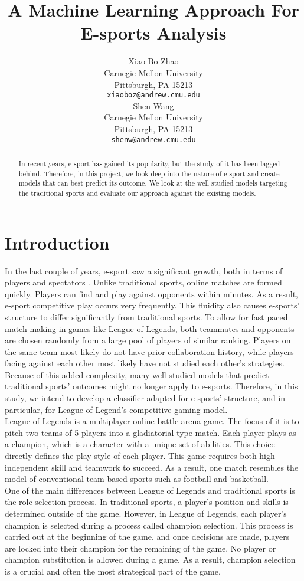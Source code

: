 \documentclass{article} %
\title{A Machine Learning Approach For E-sports Analysis}
\author{
Xiao Bo Zhao\\
Carnegie Mellon University\\
Pittsburgh, PA 15213 \\
\texttt{xiaoboz@andrew.cmu.edu} \\
\And
Shen Wang\\
Carnegie Mellon University\\
Pittsburgh, PA 15213 \\
\texttt{shenw@andrew.cmu.edu} \\
}
\begin{document}
\maketitle

\begin{abstract}
In recent years, e-sport has gained its popularity, but the study of it has been lagged behind. Therefore, in this project, we look deep into the nature of e-sport and create models that can best predict its outcome. We look at the well studied models targeting the traditional sports and evaluate our approach against the existing models.
\end{abstract}

\section{Introduction}
In the last couple of years, e-sport saw a significant growth, both in terms of players and spectators \cite{Witkowski:2013:ERC:2513002.2513008}. Unlike traditional sports, online matches are formed quickly. Players can find and play against opponents within minutes. As a result, e-sport competitive play occurs very frequently. This fluidity also causes e-sports’ structure to differ significantly from traditional sports. To allow for fast paced match making in games like League of Legends, both teammates and opponents are chosen randomly from a large pool of players of similar ranking. Players on the same team most likely do not have prior collaboration history, while players facing against each other most likely have not studied each other’s strategies. Because of this added complexity, many well-studied models that predict traditional sports’ outcomes might no longer apply to e-sports. Therefore, in this study, we intend to develop a classifier adapted for e-sports’ structure, and in particular, for League of Legend’s competitive gaming model.\\
League of Legends is a multiplayer online battle arena game. The focus of it is to pitch two teams of 5 players into a gladiatorial type match. Each player plays as a champion, which is a character with a unique set of abilities. This choice directly defines the play style of each player. This game requires both high independent skill and teamwork to succeed. As a result, one match resembles the model of conventional team-based sports such as football and basketball.\\
One of the main differences between League of Legends and traditional sports is the role selection process. In traditional sports, a player's position and skills is determined outside of the game. However, in League of Legends, each player's champion is selected during a process called champion selection. This process is carried out at the beginning of the game, and once decisions are made, players are locked into their champion for the remaining of the game. No player or champion substitution is allowed during a game. As a result, champion selection is a crucial and often the most strategical part of the game.\\
\end{document}
